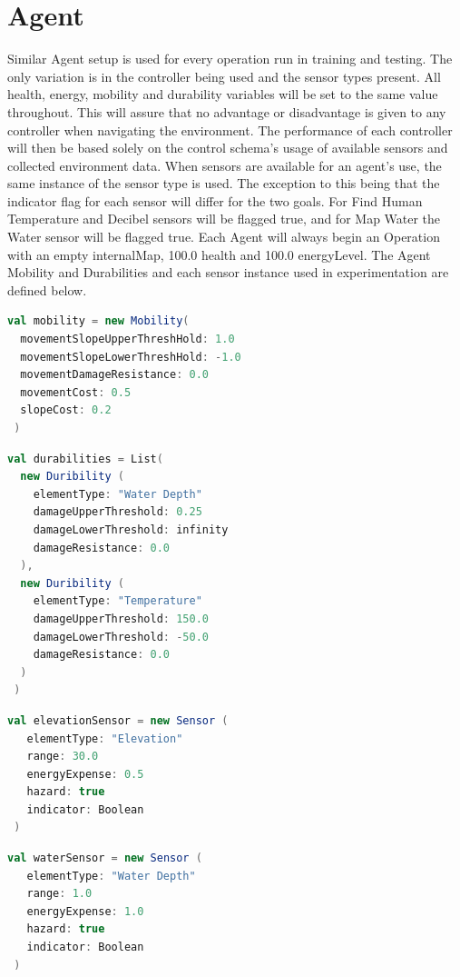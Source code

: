\section{Agent}
Similar Agent setup is used for every operation run in training and testing.
The only variation is in the controller being used and the sensor types present.
All health, energy, mobility and durability variables will be set to the same value throughout.
This will assure that no advantage or disadvantage is given to any controller when navigating the environment.
The performance of each controller will then be based solely on the control schema's usage of available sensors and collected environment data.
When sensors are available for an agent's use, the same instance of the sensor type is used.
The exception to this being that the indicator flag for each sensor will differ for the two goals.
For Find Human Temperature and Decibel sensors will be flagged true, and for Map Water the Water sensor will be flagged true.
Each Agent will always begin an Operation with an empty internalMap, 100.0 health and 100.0 energyLevel.
The Agent Mobility and Durabilities and each sensor instance used in experimentation are defined below.

\begin{lstlisting}[language=Scala]
 val mobility = new Mobility(
  movementSlopeUpperThreshHold: 1.0
  movementSlopeLowerThreshHold: -1.0
  movementDamageResistance: 0.0
  movementCost: 0.5
  slopeCost: 0.2
 )
\end{lstlisting}

\begin{lstlisting}[language=Scala]
 val durabilities = List(
  new Duribility (
    elementType: "Water Depth"
    damageUpperThreshold: 0.25
    damageLowerThreshold: infinity
    damageResistance: 0.0
  ),
  new Duribility (
    elementType: "Temperature"
    damageUpperThreshold: 150.0
    damageLowerThreshold: -50.0
    damageResistance: 0.0
  )
 )
\end{lstlisting}

\begin{lstlisting}[language=Scala]
 val elevationSensor = new Sensor (
   elementType: "Elevation"
   range: 30.0
   energyExpense: 0.5
   hazard: true
   indicator: Boolean
 )
\end{lstlisting}

\begin{lstlisting}[language=Scala]
 val waterSensor = new Sensor (
   elementType: "Water Depth"
   range: 1.0
   energyExpense: 1.0
   hazard: true
   indicator: Boolean
 )
\end{lstlisting}


